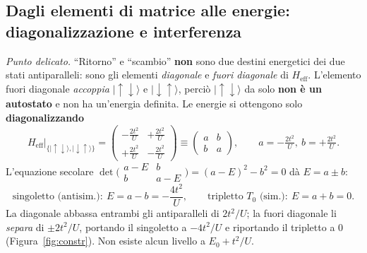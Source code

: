 \documentclass[11pt,a4paper]{article}
\newcommand{\ket}[1]{\lvert #1 \rangle}
\newcommand{\up}{\uparrow}
\newcommand{\dn}{\downarrow}
\newcommand{\Heff}{H_{\mathrm{eff}}}
\theoremstyle{definition}
\theoremstyle{remark}
\begin{document}
\FloatBarrier
\subsection{Dagli elementi di matrice alle energie: diagonalizzazione e interferenza}
\label{sub:interferenza}

\emph{Punto delicato.} ``Ritorno'' e ``scambio'' \textbf{non} sono due destini energetici dei due stati
antiparalleli: sono gli elementi \emph{diagonale} e \emph{fuori diagonale} di $\Heff$. L'elemento fuori
diagonale \emph{accoppia} $\ket{\up\dn}$ e $\ket{\dn\up}$, perciò $\ket{\up\dn}$ da solo \textbf{non è un
autostato} e non ha un'energia definita. Le energie si ottengono solo \textbf{diagonalizzando}
\begin{equation}
\Heff\big|_{\{\ket{\up\dn},\ket{\dn\up}\}}
=\begin{pmatrix} -\frac{2t^2}{U} & +\frac{2t^2}{U}\\[3pt] +\frac{2t^2}{U} & -\frac{2t^2}{U}\end{pmatrix}
\equiv\begin{pmatrix} a & b\\ b & a\end{pmatrix},\qquad a=-\tfrac{2t^2}{U},\ b=+\tfrac{2t^2}{U}.
\end{equation}
L'equazione secolare $\det\big(\begin{smallmatrix} a-E & b\\ b & a-E\end{smallmatrix}\big)=(a-E)^2-b^2=0$ dà
$E=a\pm b$:
\begin{equation}
\text{singoletto (antisim.)}:\ E=a-b=-\frac{4t^2}{U},\qquad
\text{tripletto }T_0\text{ (sim.)}:\ E=a+b=0 .
\label{eq:autovalori}
\end{equation}
La diagonale abbassa entrambi gli antiparalleli di $2t^2/U$; la fuori diagonale li \emph{separa} di
$\pm2t^2/U$, portando il singoletto a $-4t^2/U$ e riportando il tripletto a $0$ (Figura~\ref{fig:constr}).
Non esiste alcun livello a $E_0+t^2/U$.
\end{document}
